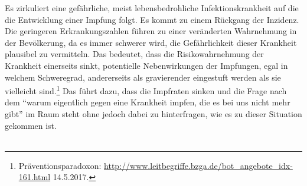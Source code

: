 \documentclass[
    a4paper,
    12pt,
    hyphens,
    chapterprefix=true,
    headheight=33pt,
    footheight=29pt,
    headings=optiontohead, %
]{scrartcl}
\begin{document}
{ Es zirkuliert eine gefährliche, meist lebensbedrohliche Infektionskrankheit auf die die Entwicklung einer Impfung folgt. Es kommt zu einem Rückgang der Inzidenz. Die geringeren Erkrankungszahlen führen zu einer veränderten Wahrnehmung in der Bevölkerung, da es immer schwerer wird, die Gefährlichkeit dieser Krankheit plausibel zu vermitteln. Das bedeutet, dass die Risikowahrnehmung der Krankheit einerseits sinkt, potentielle Nebenwirkungen der Impfungen, egal in welchem Schweregrad, andererseits als gravierender eingestuft werden als sie vielleicht sind.\footnote{Präventionsparadoxon: \url{http://www.leitbegriffe.bzga.de/bot_angebote_idx-161.html} 14.5.2017.} Das führt dazu, dass die Impfraten sinken und die Frage nach dem "`warum eigentlich gegen eine Krankheit impfen, die es bei uns nicht mehr gibt"' im Raum steht ohne jedoch dabei zu hinterfragen, wie es zu dieser Situation gekommen ist.\\
\\

}
\end{document}

